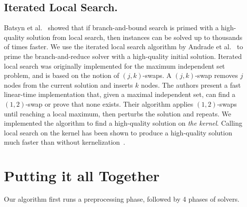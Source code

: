 \documentclass[twoside,leqno,twocolumn]{article}
\begin{document}
\subsection{Iterated Local Search.}
Batsyn et al.~\cite{batsyn-mcs-ils-2014} showed that if branch-and-bound search is primed with a high-quality solution from local search, then instances can be solved up to thousands of times faster. 
We use the iterated local search algorithm by Andrade et al.~\cite{andrade-2012} to prime the branch-and-reduce solver with a high-quality initial solution. Iterated local search was originally implemented for the maximum independent set problem, and is based on the notion of $(j,k)$-swaps. A $(j,k)$-swap removes $j$ nodes from the current solution and inserts $k$ nodes. The authors present a fast linear-time implementation that, given a maximal independent set, can find a $(1,2)$-swap or prove that none exists. Their algorithm applies $(1,2)$-swaps until reaching a local maximum, then perturbs the solution and repeats. We implemented the algorithm to find a high-quality solution on \emph{the kernel}. Calling local search on the kernel has been shown to produce a high-quality solution much faster than without kernelization~\cite{chang2017computing,dahlum2016accelerating}.

\section{Putting it all Together}
Our algorithm first runs a preprocessing phase, followed by 4 phases of solvers.


%
\end{document}
